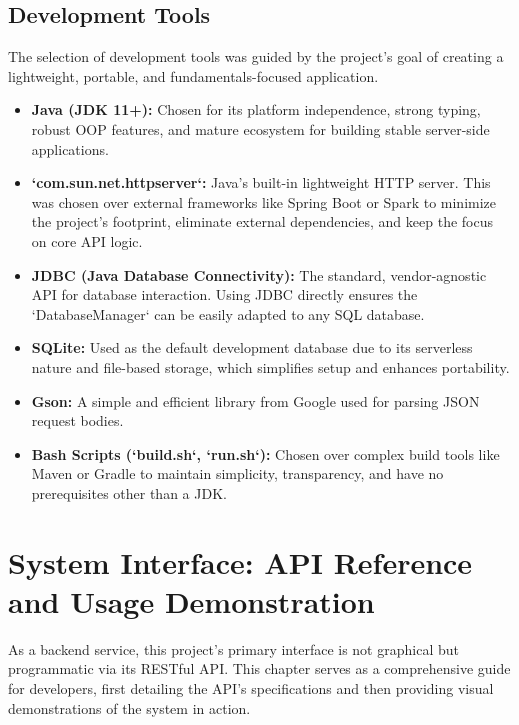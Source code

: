 \documentclass[12pt, a4paper]{report}
\begin{document}
\section{Development Tools}
The selection of development tools was guided by the project's goal of creating a lightweight, portable, and fundamentals-focused application.
\begin{itemize}
    \item \textbf{Java (JDK 11+):} Chosen for its platform independence, strong typing, robust OOP features, and mature ecosystem for building stable server-side applications.
    \item \textbf{`com.sun.net.httpserver`:} Java's built-in lightweight HTTP server. This was chosen over external frameworks like Spring Boot or Spark to minimize the project's footprint, eliminate external dependencies, and keep the focus on core API logic.
    \item \textbf{JDBC (Java Database Connectivity):} The standard, vendor-agnostic API for database interaction. Using JDBC directly ensures the `DatabaseManager` can be easily adapted to any SQL database.
    \item \textbf{SQLite:} Used as the default development database due to its serverless nature and file-based storage, which simplifies setup and enhances portability.
    \item \textbf{Gson:} A simple and efficient library from Google used for parsing JSON request bodies.
    \item \textbf{Bash Scripts (`build.sh`, `run.sh`):} Chosen over complex build tools like Maven or Gradle to maintain simplicity, transparency, and have no prerequisites other than a JDK.
\end{itemize}

\clearpage

\chapter{System Interface: API Reference and Usage Demonstration}
\label{chap:api_reference}

As a backend service, this project's primary interface is not graphical but programmatic via its RESTful API. This chapter serves as a comprehensive guide for developers, first detailing the API's specifications and then providing visual demonstrations of the system in action.
\end{document}
